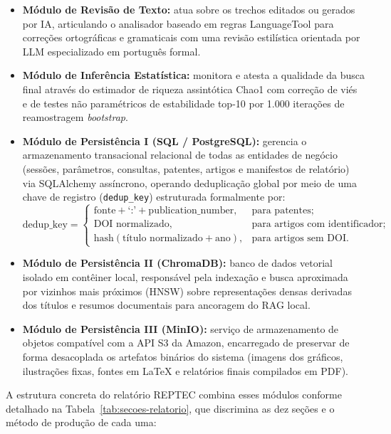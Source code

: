 \documentclass[12pt, a4paper]{article}
\begin{document}
\begin{itemize}[leftmargin=*]
    \item \textbf{Módulo de Revisão de Texto:} atua sobre os trechos editados ou gerados por IA, articulando o analisador baseado em regras LanguageTool para correções ortográficas e gramaticais com uma revisão estilística orientada por LLM especializado em português formal.
    
    \item \textbf{Módulo de Inferência Estatística:} monitora e atesta a qualidade da busca final através do estimador de riqueza assintótica Chao1 com correção de viés e de testes não paramétricos de estabilidade top-10 por 1.000 iterações de reamostragem \textit{bootstrap}.
    
    \item \textbf{Módulo de Persistência I (SQL / PostgreSQL):} gerencia o armazenamento transacional relacional de todas as entidades de negócio (sessões, parâmetros, consultas, patentes, artigos e manifestos de relatório) via SQLAlchemy assíncrono, operando deduplicação global por meio de uma chave de registro (\texttt{dedup\_key}) estruturada formalmente por:
   $$
    \text{dedup\_key} = 
    \begin{cases}
      \text{fonte} + \text{`:'} + \text{publication\_number}, & \text{para patentes;} \\[4pt]
      \text{DOI normalizado}, & \text{para artigos com identificador;} \\[4pt]
      \text{hash}(\text{título normalizado} + \text{ano}), & \text{para artigos sem DOI.}
    \end{cases}
    $$
    
    \item \textbf{Módulo de Persistência II (ChromaDB):} banco de dados vetorial isolado em contêiner local, responsável pela indexação e busca aproximada por vizinhos mais próximos (HNSW) sobre representações densas derivadas dos títulos e resumos documentais para ancoragem do RAG local.
    
    \item \textbf{Módulo de Persistência III (MinIO):} serviço de armazenamento de objetos compatível com a API S3 da Amazon, encarregado de preservar de forma desacoplada os artefatos binários do sistema (imagens dos gráficos, ilustrações fixas, fontes em LaTeX e relatórios finais compilados em PDF).
  \end{itemize}

  A estrutura concreta do relatório REPTEC combina esses módulos conforme detalhado na Tabela~\ref{tab:secoes-relatorio}, que discrimina as dez seções e o método de produção de cada uma:
\end{document}
